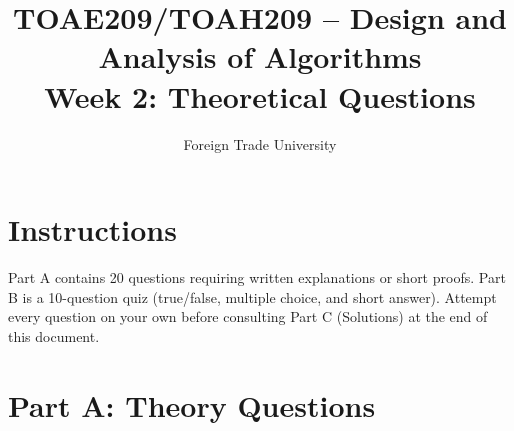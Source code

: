 \documentclass[11pt]{article}
\title{TOAE209/TOAH209 -- Design and Analysis of Algorithms\\[4pt]
\large Week 2: Theoretical Questions}
\author{Foreign Trade University}
\date{}
\begin{document}
\maketitle

\section*{Instructions}

Part A contains 20 questions requiring written explanations or short proofs. Part B is a
10-question quiz (true/false, multiple choice, and short answer). Attempt every question
on your own before consulting Part C (Solutions) at the end of this document.

\section*{Part A: Theory Questions}
\end{document}
